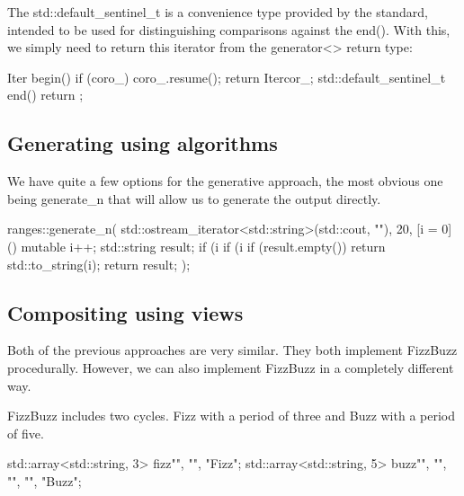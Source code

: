 The std::default\_sentinel\_t is a convenience type provided by the standard, intended to be used for distinguishing comparisons against the end(). With this, we simply need to return this iterator from the generator<> return type:

\begin{box-note}
\begin{cppcode}
Iter begin() {
    if (coro_) {
        coro_.resume();
    } 
    return Iter{cor_};
}
std::default_sentinel_t end() { 
    return {}; 
}
\end{cppcode}
\end{box-note}

\subsection{Generating using algorithms}

We have quite a few options for the generative approach, the most obvious one being generate\_n that will allow us to generate the output directly.

\begin{box-note}
\begin{cppcode}
ranges::generate_n(
    std::ostream_iterator<std::string>(std::cout, "\n"), 
    20,
    [i = 0]() mutable {
        i++;
        std::string result;
        if (i %
        if (i %
        if (result.empty()) return std::to_string(i);
        return result;
});
\end{cppcode}
\end{box-note}

\subsection{Compositing using views}

Both of the previous approaches are very similar. They both implement FizzBuzz procedurally. However, we can also implement FizzBuzz in a completely different way.

FizzBuzz includes two cycles. Fizz with a period of three and Buzz with a period of five.

\begin{box-note}
\begin{cppcode}
std::array<std::string, 3> fizz{"", "", "Fizz"};
std::array<std::string, 5> buzz{"", "", "", "", "Buzz"};
\end{cppcode}
\end{box-note}

